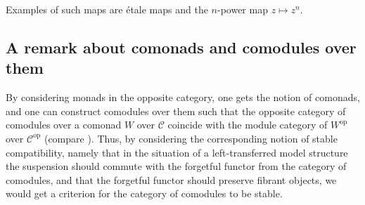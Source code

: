 \documentclass{article}
\newcommand{\cC}{\mathcal{C}}
\theoremstyle{definition}
\theoremstyle{remark}
\begin{document}
Examples of such maps are \'etale maps \cite{balmer:etalneth} and the 
$n$-power map $z \mapsto z^n$.

\subsection{A remark about comonads and comodules over them} \label{ssc:comodules}

By considering monads in the opposite category, one gets the notion of 
comonads, and one can construct comodules over them such that the opposite 
category of comodules over a comonad $W$ over $\cC$ coincide with the module 
category of $W^{\text{op}}$ over $\cC^{\text{op}}$ 
(compare \cite[remark 5.19]{balmer:septrcat}). 
Thus, by considering the corresponding notion of stable compatibility, namely
that in the situation of a left-transferred model structure the suspension should commute with the forgetful functor from the 
category of comodules, and that the forgetful functor should preserve fibrant
objects, we would get a criterion for the category of comodules to be stable.



\end{document}
